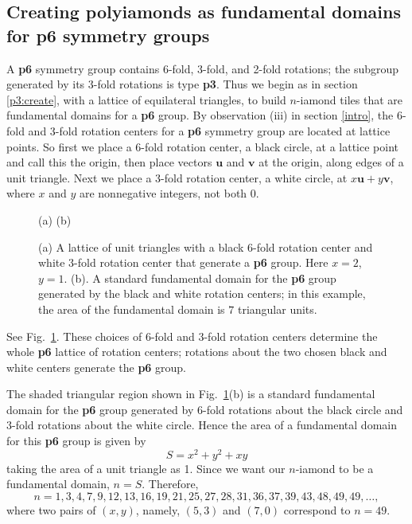 \documentclass{ws-ijcga}
\begin{document}
\subsection{Creating polyiamonds as fundamental domains for {\bf p6} symmetry groups}
\label{p6:create}
A {\bf p6} symmetry group contains 6-fold, 3-fold, and 2-fold rotations; 
the subgroup generated by its 3-fold rotations is type {\bf p3}. 
Thus we begin as in section \ref{p3:create}, with a lattice of equilateral triangles,
to build $n$-iamond tiles that are fundamental domains for a {\bf p6} group. 
By observation (iii) in section \ref{intro}, 
the 6-fold and 3-fold rotation centers for a {\bf p6} symmetry group are located at lattice points. 
So first we place a 6-fold rotation center, a black circle, at a lattice point and call this the origin, then
place vectors $\mathbf u$ and $\mathbf v$ at the origin, along edges of a unit triangle. 
Next we place a 3-fold rotation center, 
a white circle, at $x{\mathbf u} + y{\mathbf v}$, 
where $x$ and $y$ are nonnegative integers, 
not both $0$. 
\begin{figure}[h]
\centerline{
\hspace{1em}
}
\centerline{(a) \hspace{3cm} (b)}
\vspace*{8pt}
\caption{
(a) A lattice of unit triangles with a black 6-fold rotation center and white 3-fold rotation center that
generate a {\bf p6} group. 
Here $x = 2$, $y = 1$. (b). A standard fundamental domain for the {\bf p6} group generated by the
black and white rotation centers; 
in this example, the area of the fundamental domain is $7$ triangular units.
\label{p6lattice}
}
\end{figure}
See Fig.~\ref{p6lattice}. 
These choices of 6-fold and 3-fold rotation centers determine the whole {\bf p6} lattice of rotation
centers; 
rotations about the two chosen black and white centers generate the {\bf p6} group.

The shaded triangular region shown in Fig.~\ref{p6lattice}(b) is a standard fundamental domain for the {\bf p6}
group generated by 6-fold rotations about the black circle and 3-fold rotations about the white circle. 
Hence the area of a fundamental domain for this {\bf p6} group is given by
\begin{equation}
S=x^2+y^2+xy
\end{equation}
taking the area of a unit triangle as 1. 
Since we want our $n$-iamond to be a fundamental
domain, $n = S$. Therefore,
\begin{equation}
n=1, 3, 4, 7, 9, 12, 13, 16, 19, 21, 25, 27, 28, 31, 36, 37, 39, 43, 48, 49, 49, \ldots,
\label{p6:n}
\end{equation}  
where two pairs of $(x,y)$, namely, $(5,3)$ and $(7,0)$ correspond to $n = 49$.
\end{document}
